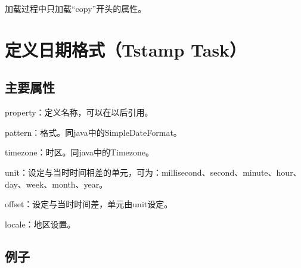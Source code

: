 

加载过程中只加载“copy”开头的属性。








\section{定义日期格式（Tstamp Task）}

\subsection{主要属性}

property：定义名称，可以在以后引用。

pattern：格式。同java中的SimpleDateFormat。

timezone：时区。同java中的Timezone。

unit：设定与当时时间相差的单元，可为：millisecond、second、minute、hour、day、week、month、year。

offset：设定与当时时间差，单元由unit设定。

locale：地区设置。

\subsection{例子}





